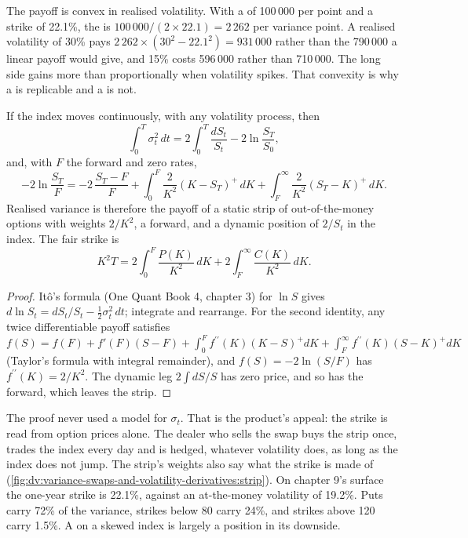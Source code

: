 The payoff is convex in realised volatility. With a  of 100\,000 per point and a strike of
22.1\%, the  is $100\,000/(2\times22.1)=2\,262$ per variance point. A realised volatility
of 30\% pays $2\,262\times(30^2-22.1^2)=931\,000$ rather than the 790\,000 a linear payoff would give, and
15\% costs 596\,000 rather than 710\,000. The long side gains more than proportionally when volatility spikes.
That convexity is why a  is replicable and a  is not.

\begin{proposition}[Replication]\label{prop:dv:variance-swaps-and-volatility-derivatives:rep}
If the index moves continuously, with any volatility process, then
\[
\int_0^T\sigma_t^2\,dt=2\int_0^T\frac{dS_t}{S_t}-2\ln\frac{S_T}{S_0},
\]
and, with $F$ the forward and zero rates,
\[
-2\ln\frac{S_T}{F}=-2\,\frac{S_T-F}F+\int_0^F\frac2{K^2}(K-S_T)^+\,dK+\int_F^\infty\frac2{K^2}(S_T-K)^+\,dK.
\]
Realised variance is therefore the payoff of a static strip of out-of-the-money options with weights
$2/K^2$, a forward, and a dynamic position of $2/S_t$ in the index. The fair strike is
\[
K^2T=2\int_0^F\frac{P(K)}{K^2}\,dK+2\int_F^\infty\frac{C(K)}{K^2}\,dK.
\]
\end{proposition}
\begin{proof}
Itô's formula (One Quant Book 4, chapter 3) for $\ln S$ gives
$d\ln S_t=dS_t/S_t-\frac12\sigma_t^2\,dt$; integrate and rearrange. For the second identity, any twice
differentiable payoff satisfies
$f(S)=f(F)+f'(F)(S-F)+\int_0^Ff^{\prime\prime}(K)(K-S)^+dK+\int_F^\infty f^{\prime\prime}(K)(S-K)^+dK$ (Taylor's formula with integral
remainder), and $f(S)=-2\ln(S/F)$ has $f^{\prime\prime}(K)=2/K^2$. The dynamic leg $2\int dS/S$ has zero price, and so
has the forward, which leaves the strip.
\end{proof}

The proof never used a model for $\sigma_t$. That is the product's appeal: the strike is read from option
prices alone. The dealer who sells the swap buys the strip once, trades the index every day and is
hedged, whatever volatility does, as long as the index does not jump. The strip's weights also say what
the strike is made of (\cref{fig:dv:variance-swaps-and-volatility-derivatives:strip}). On chapter 9's
surface the one-year strike is 22.1\%, against an at-the-money volatility of 19.2\%. Puts carry 72\% of the
variance, strikes below 80 carry 24\%, and strikes above 120 carry 1.5\%. A  on a skewed index is
largely a position in its downside.

